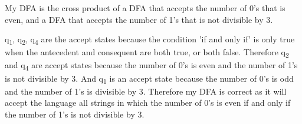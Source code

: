 \documentclass[11pt]{article}
\newcommand\question[2]{
\shadowbox{
\begin{minipage}{45em}\vspace{1ex}\textbf{Problem #1}
\newline
\vspace{1ex}
\end{minipage}
}
\vspace{1ex}
}
\begin{document}
\begin{enumerate}
My DFA is the cross product of a DFA that accepts the number of 0's that is even, and a DFA that accepts the number of 1's that is not divisible by 3. 
\newline

q\textsubscript{1}, q\textsubscript{2}, q\textsubscript{4} are the accept states because the condition 'if and only if' is only true when the antecedent and consequent are both true, or both false. Therefore q\textsubscript{2} and q\textsubscript{4} are accept states because the number of 0's is even and the number of 1's is not divisible by 3. And q\textsubscript{1} is an accept state because the number of 0's is odd and the number of 1's is divisible by 3. Therefore my DFA is correct as it will accept the language all strings in which the number of 0's is even if and only if the number of 1's is
not divisible by 3.

\end{enumerate}
\newpage

\question{2}{John X and Jane Y} %
\end{document}

